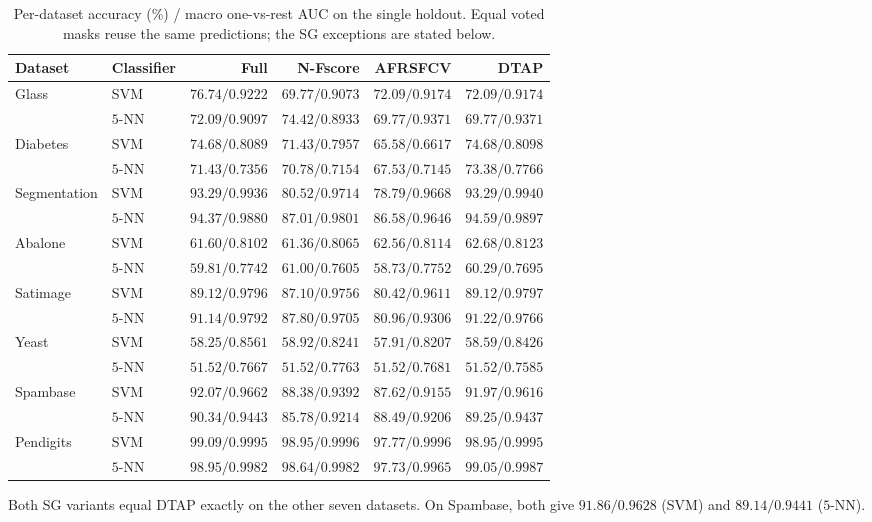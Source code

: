 \documentclass[]{interact}
\theoremstyle{plain}
\theoremstyle{definition}
\theoremstyle{remark}
\begin{document}
\begin{table}[htbp]
\centering\small\setlength{\tabcolsep}{4pt}
\caption{Per-dataset accuracy (\%) / macro one-vs-rest AUC on the single holdout. Equal voted masks reuse the same predictions; the SG exceptions are stated below.}\label{tab:acc}
\begin{tabular}{llrrrr}
\toprule
Dataset & Classifier & Full & N-Fscore & AFRSFCV & DTAP \\
\midrule
Glass & SVM & $76.74/0.9222$ & $69.77/0.9073$ & $72.09/0.9174$ & $72.09/0.9174$ \\
 & $5$-NN & $72.09/0.9097$ & $74.42/0.8933$ & $69.77/0.9371$ & $69.77/0.9371$ \\
Diabetes & SVM & $74.68/0.8089$ & $71.43/0.7957$ & $65.58/0.6617$ & $74.68/0.8098$ \\
 & $5$-NN & $71.43/0.7356$ & $70.78/0.7154$ & $67.53/0.7145$ & $73.38/0.7766$ \\
Segmentation & SVM & $93.29/0.9936$ & $80.52/0.9714$ & $78.79/0.9668$ & $93.29/0.9940$ \\
 & $5$-NN & $94.37/0.9880$ & $87.01/0.9801$ & $86.58/0.9646$ & $94.59/0.9897$ \\
Abalone & SVM & $61.60/0.8102$ & $61.36/0.8065$ & $62.56/0.8114$ & $62.68/0.8123$ \\
 & $5$-NN & $59.81/0.7742$ & $61.00/0.7605$ & $58.73/0.7752$ & $60.29/0.7695$ \\
Satimage & SVM & $89.12/0.9796$ & $87.10/0.9756$ & $80.42/0.9611$ & $89.12/0.9797$ \\
 & $5$-NN & $91.14/0.9792$ & $87.80/0.9705$ & $80.96/0.9306$ & $91.22/0.9766$ \\
Yeast & SVM & $58.25/0.8561$ & $58.92/0.8241$ & $57.91/0.8207$ & $58.59/0.8426$ \\
 & $5$-NN & $51.52/0.7667$ & $51.52/0.7763$ & $51.52/0.7681$ & $51.52/0.7585$ \\
Spambase & SVM & $92.07/0.9662$ & $88.38/0.9392$ & $87.62/0.9155$ & $91.97/0.9616$ \\
 & $5$-NN & $90.34/0.9443$ & $85.78/0.9214$ & $88.49/0.9206$ & $89.25/0.9437$ \\
Pendigits & SVM & $99.09/0.9995$ & $98.95/0.9996$ & $97.77/0.9996$ & $98.95/0.9995$ \\
 & $5$-NN & $98.95/0.9982$ & $98.64/0.9982$ & $97.73/0.9965$ & $99.05/0.9987$ \\
\bottomrule
\end{tabular}
\par\smallskip\begin{minipage}{0.97\textwidth}\footnotesize Both SG variants equal DTAP exactly on the other seven datasets. On Spambase, both give $91.86/0.9628$ (SVM) and $89.14/0.9441$ ($5$-NN). \end{minipage}
\end{table}
\end{document}
